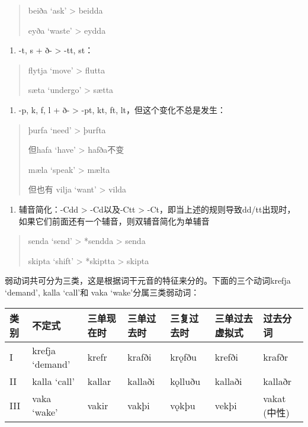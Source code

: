 \begin{quote}
beiða `ask' \textgreater{} beidda

eyða `waste' \textgreater{} eydda
\end{quote}

\begin{enumerate}
\def\labelenumi{\arabic{enumi})}
\setcounter{enumi}{3}
\item
  -t, s + ð- \textgreater{} -tt, st：
\end{enumerate}

\begin{quote}
flytja `move‌' \textgreater{} flutta

sæta `undergo‌' \textgreater{} sætta
\end{quote}

\begin{enumerate}
\def\labelenumi{\arabic{enumi})}
\setcounter{enumi}{4}
\item
  -p, k, f, l + ð- \textgreater{} -pt, kt, ft,
  lt，但这个变化不总是发生：
\end{enumerate}

\begin{quote}
þurfa `need‌' \textgreater{} þurfta

但hafa `have‌' \textgreater{} hafða不变

mæla `speak‌' \textgreater{} mælta

但也有 vilja `want‌' \textgreater{} vilda
\end{quote}

\begin{enumerate}
\def\labelenumi{\arabic{enumi})}
\setcounter{enumi}{5}
\item
  辅音简化：-Cdd \textgreater{} -Cd以及-Ctt \textgreater{}
  -Ct，即当上述的规则导致dd/tt出现时，如果它们前面还有一个辅音，则双辅音简化为单辅音
\end{enumerate}

\begin{quote}
senda `send‌' \textgreater{} *sendda \textgreater{} senda

skipta `shift‌' \textgreater{} *skiptta \textgreater{} skipta
\end{quote}

弱动词共可分为三类，这是根据词干元音的特征来分的。下面的三个动词krefja
`demand‌', kalla `call‌'和 vaka `wake‌'分属三类弱动词：

\begin{longtable}{lllllll}
\toprule
类别 & 不定式 & 三单现在时 & 三单过去时 & 三复过去时 & 三单过去虚拟式 & 过去分词 \\
\midrule
\endhead
\bottomrule
\endfoot
I & krefja `demand‌' & krefr & krafði & krǫfðu & krefði & krafðr \\
II & kalla `call‌' & kallar & kallaði & kǫlluðu & kallaði & kallaðr \\
III & vaka `wake‌' & vakir & vakþi & vǫkþu & vekþi & vakat (中性) \\
\end{longtable}


